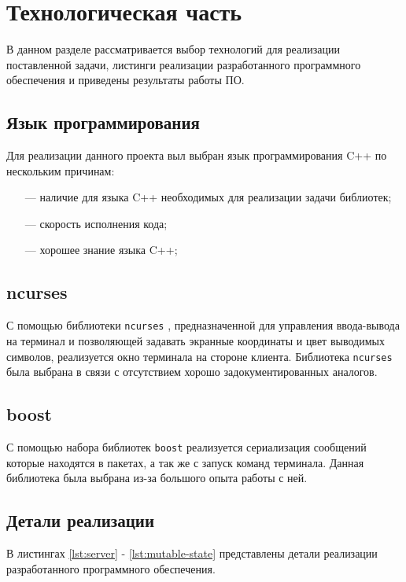 \chapter{Технологическая часть}

В данном разделе рассматривается выбор технологий для реализации поставленной задачи, листинги реализации разработанного программного обеспечения и приведены результаты работы ПО.

\section{Язык программирования}

Для реализации данного проекта выл выбран язык программирования C++ \cite{c++} по нескольким причинам:

\begin{itemize}
	\item[---] наличие для языка C++ необходимых для реализации задачи библиотек;
	\item[---] скорость исполнения кода;
	\item[---] хорошее знание языка C++;
\end{itemize}

\section{ncurses}

С помощью библиотеки \texttt{ncurses} \cite{ncurses}, предназначенной для управления ввода-вывода на терминал и позволяющей задавать экранные координаты и цвет выводимых символов, реализуется окно терминала на стороне клиента. Библиотека \texttt{ncurses} была выбрана в связи с отсутствием хорошо задокументированных аналогов.

\section{boost}

С помощью набора библиотек \texttt{boost} \cite{boost} реализуется сериализация сообщений которые находятся в пакетах, а так же с запуск команд терминала. Данная библиотека была выбрана из-за большого опыта работы с ней.

\section{Детали реализации}

В листингах \ref{lst:server} - \ref{lst:mutable-state} представлены детали реализации разработанного программного обеспечения.


